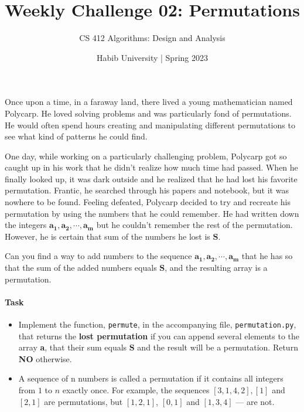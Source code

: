 \documentclass[a4paper]{exam}
\title{Weekly Challenge 02: Permutations}
\author{CS 412 Algorithms: Design and Analysis}
\date{Habib University | Spring 2023}
\begin{document}
\maketitle

\begin{questions}

    Once upon a time, in a faraway land, there lived a young mathematician named Polycarp.
    He loved solving problems and was particularly fond of permutations. He would often
    spend hours creating and manipulating different permutations to see what kind of
    patterns he could find.

    One day, while working on a particularly challenging problem, Polycarp got so caught up
    in his work that he didn't realize how much time had passed. When he finally looked up,
    it was dark outside and he realized that he had lost his favorite permutation. Frantic,
    he searched through his papers and notebook, but it was nowhere to be found. Feeling
    defeated, Polycarp decided to try and recreate his permutation by using the numbers
    that he could remember. He had written down the integers $\mathbf{a_1, a_2, \cdots , a_m}$
    but he couldn't remember the rest of the permutation.  However, he is certain that
    sum of the numbers he lost is $\mathbf{S}$.

    Can you find a way to add numbers to the sequence $\mathbf{a_1,a_2,\cdots, a_m}$ that he has
    so that the sum of the added numbers equals $\mathbf{S}$, and the resulting array is a permutation.

    \paragraph{Task}
    \begin{itemize}
        \item Implement the function, \texttt{permute}, in the accompanying file,  \texttt{permutation.py},
        that returns the \textbf{lost permutation} if you can append several elements to the array \textbf{a},
        that their sum equals $\mathbf{S}$ and the result will be a permutation. Return \textbf{NO} otherwise.
    
        \item A sequence of n numbers is called a permutation if it contains all integers from $1$ to $n$
              exactly once. For example, the sequences $[3,1,4,2], [1]$  and $[2,1]$ are permutations, but $[1,2,1]$,
              $[0,1]$ and $[1,3,4]$ — are not.


\end{itemize}
\end{questions}
\end{document}
